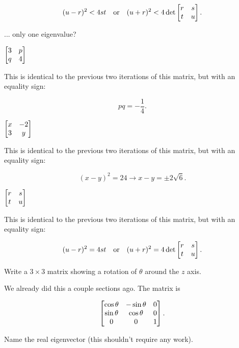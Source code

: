 \documentclass[../gatm_answers.tex]{subfiles}
\begin{document}
$$(u-r)^2 < 4st \quad\text{or}\quad (u+r)^2 < 4\det \begin{bmatrix} r & s \\ t & u \end{bmatrix}.$$

\begin{inner_problem}
\item ... only one eigenvalue?
\end{inner_problem}

\begin{iinner_problem}[start=1]
\item $\begin{bmatrix} 3 & p \\ q & 4 \end{bmatrix}$
\end{iinner_problem}

This is identical to the previous two iterations of this matrix, but with an equality sign:

$$pq = -\frac{1}{4}.$$

\begin{iinner_problem}
\item $\begin{bmatrix} x & -2 \\ 3 & y \end{bmatrix}$
\end{iinner_problem}

This is identical to the previous two iterations of this matrix, but with an equality sign:

$$(x-y)^2 = 24 \rightarrow x-y = \pm 2\sqrt{6}.$$

\begin{iinner_problem}
\item $\begin{bmatrix} r & s \\ t & u \end{bmatrix}$
\end{iinner_problem}

This is identical to the previous two iterations of this matrix, but with an equality sign:

$$(u-r)^2 = 4st \quad\text{or}\quad (u+r)^2 = 4\det \begin{bmatrix} r & s \\ t & u \end{bmatrix}.$$

\begin{outer_problem}
\item
\end{outer_problem}

\begin{inner_problem}[start=1]
\item Write a $3\times 3$ matrix showing a rotation of $\theta$ around the $z$ axis.
\end{inner_problem}

We already did this a couple sections ago. The matrix is

$$\begin{bmatrix} \cos\theta & -\sin\theta & 0 \\ \sin\theta & \cos\theta & 0 \\ 0 & 0 & 1 \end{bmatrix}.$$

\begin{inner_problem}
\item Name the real eigenvector (this shouldn't require any work).
\end{inner_problem}
\end{document}
